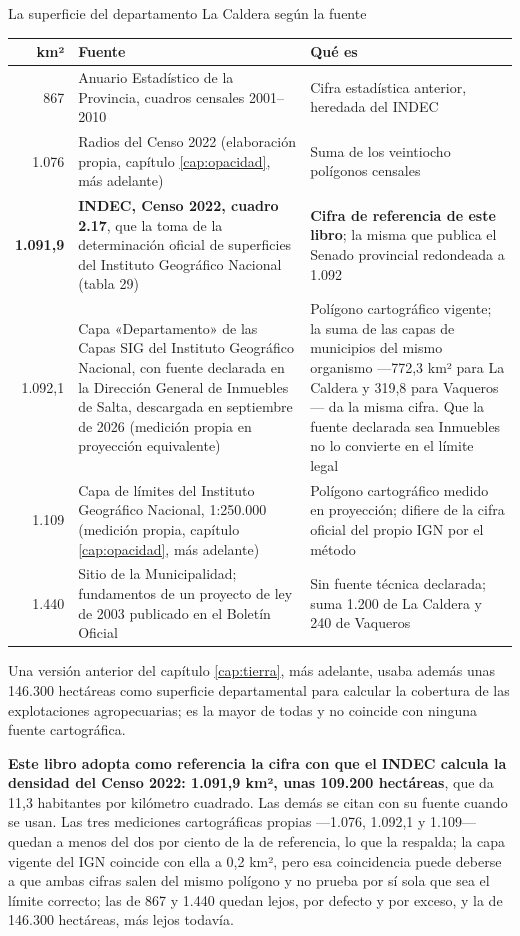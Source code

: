 \begin{ficha}{La superficie del departamento La Caldera según la fuente}
\begin{center}\small
\begin{tabular}{@{}r p{5.2cm} p{5.2cm}@{}}
\toprule
\textbf{km²} & \textbf{Fuente} & \textbf{Qué es} \\
\midrule
867 & Anuario Estadístico de la Provincia, cuadros censales 2001--2010 & Cifra estadística anterior, heredada del INDEC \\
1.076 & Radios del Censo 2022 (elaboración propia, capítulo \ref{cap:opacidad}, más adelante) & Suma de los veintiocho polígonos censales \\
\textbf{1.091,9} & \textbf{INDEC, Censo 2022, cuadro 2.17}, que la toma de la determinación oficial de superficies del Instituto Geográfico Nacional (tabla 29) & \textbf{Cifra de referencia de este libro}; la misma que publica el Senado provincial redondeada a 1.092 \\
1.092,1 & Capa «Departamento» de las Capas SIG del Instituto Geográfico Nacional, con fuente declarada en la Dirección General de Inmuebles de Salta, descargada en septiembre de 2026 (medición propia en proyección equivalente) & Polígono cartográfico vigente; la suma de las capas de municipios del mismo organismo ---772,3 km² para La Caldera y 319,8 para Vaqueros--- da la misma cifra. Que la fuente declarada sea Inmuebles no lo convierte en el límite legal \\
1.109 & Capa de límites del Instituto Geográfico Nacional, 1:250.000 (medición propia, capítulo \ref{cap:opacidad}, más adelante) & Polígono cartográfico medido en proyección; difiere de la cifra oficial del propio IGN por el método \\
1.440 & Sitio de la Municipalidad; fundamentos de un proyecto de ley de 2003 publicado en el Boletín Oficial & Sin fuente técnica declarada; suma 1.200 de La Caldera y 240 de Vaqueros \\
\bottomrule
\end{tabular}
\end{center}
Una versión anterior del capítulo \ref{cap:tierra}, más adelante, usaba además unas 146.300 hectáreas como superficie departamental para calcular la cobertura de las explotaciones agropecuarias; es la mayor de todas y no coincide con ninguna fuente cartográfica.
\end{ficha}

\textbf{Este libro adopta como referencia la cifra con que el INDEC calcula la densidad del Censo 2022: 1.091,9 km², unas 109.200 hectáreas}, que da 11,3 habitantes por kilómetro cuadrado. Las demás se citan con su fuente cuando se usan. Las tres mediciones cartográficas propias ---1.076, 1.092,1 y 1.109--- quedan a menos del dos por ciento de la de referencia, lo que la respalda; la capa vigente del IGN coincide con ella a 0,2 km², pero esa coincidencia puede deberse a que ambas cifras salen del mismo polígono y no prueba por sí sola que sea el límite correcto; las de 867 y 1.440 quedan lejos, por defecto y por exceso, y la de 146.300 hectáreas, más lejos todavía.

